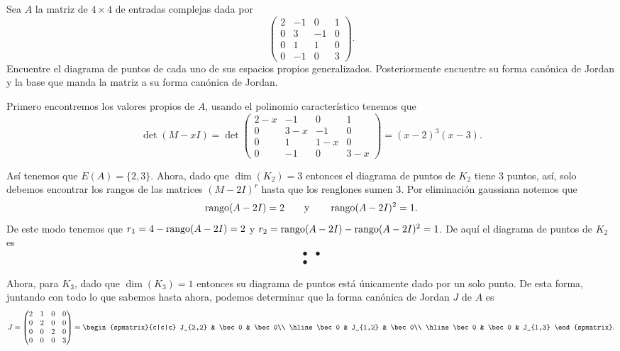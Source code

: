 \begin{example}
  Sea $A$ la matriz de $4\times 4$ de entradas complejas dada por 
    \[
      \begin{pmatrix}
      2 & -1 & 0 & 1 \\
      0 & 3 & -1 & 0 \\
      0 & 1 & 1 & 0 \\
      0 & -1 & 0 & 3 
    \end{pmatrix}.
    \]
  Encuentre el diagrama de puntos de cada uno de sus espacios propios generalizados. Posteriormente encuentre su forma canónica de Jordan y la base que manda la matriz a su forma canónica de Jordan.

  \examplesolution

  Primero encontremos los valores propios de $A$, usando el polinomio característico tenemos que
    \[
      \det(M-xI) = \det\begin{pmatrix}
        2-x & -1 & 0 & 1 \\
        0 & 3-x & -1 & 0 \\
        0 & 1 & 1-x & 0 \\
        0 & -1 & 0 & 3-x
      \end{pmatrix}
      = (x-2)^3(x-3).
    \]

  Así tenemos que $E(A) = \{2,3\}$. Ahora, dado que $\dim(K_2) = 3$ entonces el diagrama de puntos de $K_2$ tiene 3 puntos, así, solo debemos encontrar los rangos de las matrices $(M-2I)^r$ hasta que los renglones sumen 3. Por eliminación gaussiana notemos que
  \[
    \operatorname{rango}(A-2I) = 2 
      \qquad\text{y}\qquad
    \operatorname{rango}(A-2I)^2 = 1.
  \]
  De este modo tenemos que $r_1  = 4 - \operatorname{rango}(A-2I) = 2$ y $r_2 = \operatorname{rango}(A-2I) - \operatorname{rango}(A-2I)^2 = 1$. De aquí el diagrama de puntos de $K_2$ es 
  \[
    \begin{array}{cc}
      \bullet & \bullet\\
      \bullet
    \end{array}
  \]

  Ahora, para $K_3$, dado que $\dim(K_3) = 1$ entonces su diagrama de puntos está únicamente dado por un solo punto. De esta forma, juntando con todo lo que sabemos hasta ahora, podemos determinar que la forma canónica de Jordan $J$ de $A$ es
  \[
    J = \begin{pmatrix} 2 & 1 & 0 & 0 \\ 0 & 2 & 0 & 0 \\ 0 & 0 & 2 & 0 \\ 0 & 0 & 0 &3 \end{pmatrix}
    = \begin{spmatrix}{c|c|c}
      J_{2,2} & \bec 0 & \bec 0\\ \hline
      \bec 0 & J_{1,2} & \bec 0\\ \hline
      \bec 0 & \bec 0 & J_{1,3}
    \end{spmatrix}.
  \]


\end{example}
